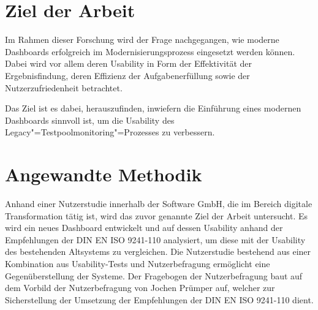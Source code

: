 \section{Ziel der Arbeit} %
\label{sec:intro:ZielDerArbeit}


Im Rahmen dieser Forschung wird der Frage nachgegangen, wie moderne Dash\-boards erfolgreich im Modernisierungsprozess eingesetzt werden können. Dabei wird vor allem deren Usability in Form der Effektivität der Ergebnisfindung, deren Effizienz der Aufgabenerfüllung sowie der Nutzerzufriedenheit betrachtet.

Das Ziel ist es dabei, herauszufinden, inwiefern die Einführung eines modernen Dash\-boards sinnvoll ist, um die Usability des Legacy"=Testpoolmonitoring"=Prozesses zu verbessern.

\section{Angewandte Methodik} %
\label{sec:intro:Methodik}

Anhand einer Nutzerstudie innerhalb der Software GmbH, die im Bereich digitale Transformation tätig ist, wird das zuvor genannte Ziel der Arbeit untersucht.
Es wird ein neues Dash\-board entwickelt und auf dessen Usability anhand der Empfehlungen der DIN EN ISO 9241-110 \cite{DIN_EN_ISO_9241-110} analysiert, um diese mit der Usability des bestehenden Altsystems zu vergleichen. Die Nutzerstudie bestehend aus einer Kombination aus Usability-Tests und Nutzerbefragung ermöglicht eine Gegenüberstellung der Systeme. Der Fragebogen der Nutzerbefragung baut auf dem Vorbild der Nutzerbefragung von Jochen Prümper \cite{Pruemper:Fragebogen-S:2006} auf, welcher zur Sicherstellung der Umsetzung der Empfehlungen der DIN EN ISO 9241-110 dient.

